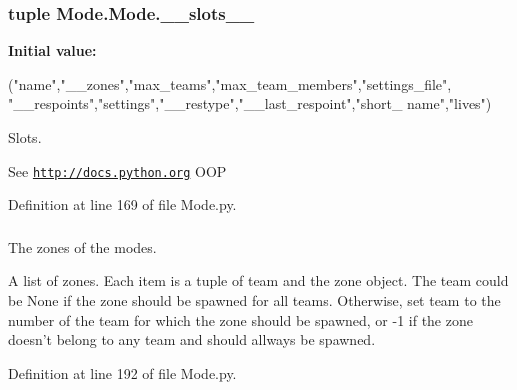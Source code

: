 \hypertarget{class_mode_1_1_mode_a6f65d9a9362971bd8896a81a0d71c642}{
\subsubsection[{\_\-\_\-slots\_\-\_\-}]{\setlength{\rightskip}{0pt plus 5cm}tuple {\bf Mode.Mode.\_\-\_\-slots\_\-\_\-}}}
\label{class_mode_1_1_mode_a6f65d9a9362971bd8896a81a0d71c642}
{\bfseries Initial value:}
\begin{DoxyCode}
("name","__zones","max_teams","max_team_members","settings_file",
                   "__respoints","settings","__restype","__last_respoint","short_
      name","lives")
\end{DoxyCode}


Slots. 

See \href{http://docs.python.org}{\tt http://docs.python.org} OOP 

Definition at line 169 of file Mode.py.

\hypertarget{class_mode_1_1_mode_a0672655c12a3e18e65d084c395d9378c}{
\subsubsection[{\_\-\_\-zones}]{}}
\label{class_mode_1_1_mode_a0672655c12a3e18e65d084c395d9378c}


The zones of the modes. 

A list of zones. Each item is a tuple of team and the zone object. The team could be None if the zone should be spawned for all teams. Otherwise, set team to the number of the team for which the zone should be spawned, or -\/1 if the zone doesn't belong to any team and should allways be spawned. 

Definition at line 192 of file Mode.py.

\hypertarget{class_mode_1_1_mode_a62c4256349100a948a336e4f41e73367}{
\subsubsection[{lives}]{}}
\label{class_mode_1_1_mode_a62c4256349100a948a336e4f41e73367}


